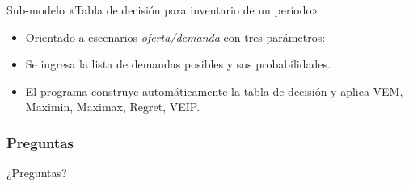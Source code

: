 \documentclass{beamer}
\begin{document}
\begin{frame}{Sub-modelo «Tabla de decisión para inventario de un período»}
  \begin{itemize}
    \item Orientado a escenarios \textit{oferta/demanda} con tres parámetros:
    \item Se ingresa la lista de demandas posibles y sus probabilidades.
    \item El programa construye automáticamente la tabla de decisión y aplica
          VEM, Maximin, Maximax, Regret, VEIP.
  \end{itemize}
\end{frame}


\begin{frame}
\frametitle{Preguntas}
\centering
\Huge{¿Preguntas?}
\end{frame}
\end{document}
